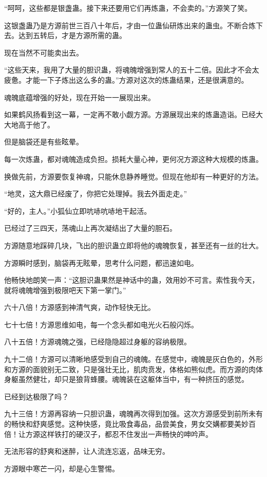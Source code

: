 \begin{this_body}
“呵呵，这些都是银盏蛊。接下来还要用它们再炼蛊，不会卖的。”方源笑了笑。

这银盏蛊乃是方源前世三百八十年后，才由一位蛊仙研炼出来的蛊虫。不断合炼下去。达到五转后，才是方源所需的蛊。

现在当然不可能卖出去。

“这些天来，我用了大量的胆识蛊，将魂魄增强到常人的五十二倍。因此才不会太疲惫。才能一下子炼出这么多的蛊。”方源对这次的炼蛊结果，还是很满意的。

魂魄底蕴增强的好处，现在开始一一展现出来。

如果鹤风扬看到这一幕，一定再不敢小觑方源。方源展现出来的炼蛊造诣。已经大大地高于他了。

但是脑袋还是有些眩晕。

每一次炼蛊，都对魂魄造成负担。损耗大量心神，更何况方源这种大规模的炼蛊。

换做先前，方源要恢复神魂，只能休息静养睡觉。但现在他却有一种更好的方法。

“地灵，这大鼎已经废了，你把它处理掉。我去外面走走。”

“好的，主人。”小狐仙立即吭哧吭哧地干起活。

已经过了三四天，荡魂山上再次凝结出了大量的胆石。

方源随意地踩碎几块，飞出的胆识蛊立即将他的魂魄恢复，甚至还有一丝的壮大。

方源瞬时感到，脑袋再无眩晕，思考什么问题，都迅速如电。

他畅快地朗笑一声：“这胆识蛊果然是神话中的蛊，效用妙不可言。索性我今天，就将魂魄增强到极限吧天下第一掌门。”

六十八倍！方源感到神清气爽，动作轻快无比。

七十七倍！方源思维如电，每一个念头都如电光火石般闪烁。

八十五倍！方源魂魄之强，已经隐隐超过身躯的容纳极限。

九十二倍！方源可以清晰地感受到自己的魂魄。在感觉中，魂魄是灰白色的，外形和方源的面貌别无二致，只是强壮无比，肌肉贲发，体格如熊似虎。而方源的肉体身躯虽然健壮，却只是狼背蜂腰。魂魄装在这躯体当中，有一种挤压的感觉。

已经到达极限了吗？

九十三倍！方源再容纳一只胆识蛊，魂魄再次得到加强。这次方源感受到前所未有的畅快和舒爽感觉。这种快感，竟比吸食毒品，品尝美食，男女交媾都要美妙百倍！让方源这样铁打的硬汉子，都忍不住发出一声畅快的呻吟声。

无法形容的舒爽和迷醉，让人流连忘返，品味无穷。

方源眼中寒芒一闪，却是心生警惕。


\end{this_body}
